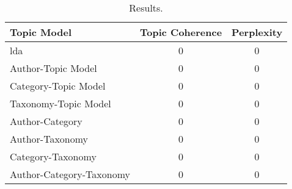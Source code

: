 \begin{table}[h]
	\centering
	\caption{Results.}
	\begin{tabular}{l|c|c}
		Topic Model & Topic Coherence & Perplexity \\
		\midrule
		\Acrlong{lda} & 0 & 0 \\
		Author-Topic Model & 0 & 0 \\
		Category-Topic Model & 0 & 0 \\
		Taxonomy-Topic Model & 0 & 0 \\
		Author-Category & 0 & 0 \\
		Author-Taxonomy & 0 & 0 \\
		Category-Taxonomy & 0 & 0 \\
		Author-Category-Taxonomy & 0 & 0 \\
	\end{tabular}
	\label{tab:metric_results}
\end{table}